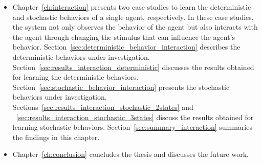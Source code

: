 \begin{itemize}
\item Chapter~\ref{ch:interaction} presents two case studies to learn the deterministic and stochastic behaviors of a single agent, respectively. In these case studies, the system not only observes the behavior of the agent but also interacts with the agent through changing the stimulus that can influence the agent's behavior. Section~\ref{sec:deterministic_behavior_interaction} describes the deterministic behaviors under investigation. Section~\ref{sec:results_interaction_deterministic} discusses the results obtained for learning the deterministic behaviors. Section~\ref{sec:stochastic_behavior_interaction} presents the stochastic behaviors under investigation. Sections~\ref{sec:results_interaction_stochastic_2states} and ~\ref{sec:results_interaction_stochastic_3states} discuss the results obtained for learning stochastic behaviors. Section~\ref{sec:summary_interaction} summaries the findings in this chapter.

\item Chapter~\ref{ch:conclusion} concludes the thesis and discusses the future work. 

\end{itemize}
